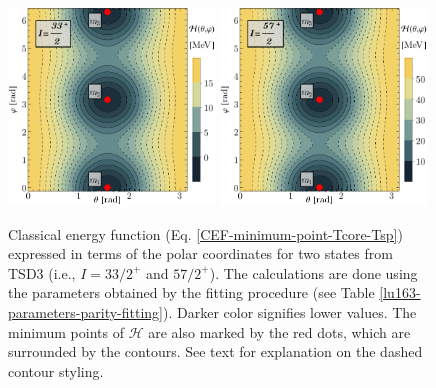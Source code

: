 \begin{figure}
    \centering
    \includegraphics[width=0.49\textwidth]{Chapters/Figures/parity-partners-plots/contour-tsd3-1.pdf}
    \includegraphics[width=0.49\textwidth]{Chapters/Figures/parity-partners-plots/contour-tsd3-2.pdf}
    \caption{Classical energy function (Eq. \ref{CEF-minimum-point-Tcore-Tsp}) expressed in terms of the polar coordinates for two states from TSD3 (i.e., $I=33/2^+$ and $57/2^+$). The calculations are done using the parameters obtained by the fitting procedure (see Table \ref{lu163-parameters-parity-fitting}). Darker color signifies lower values. The minimum points of $\mathcal{H}$ are also marked by the red dots, which are surrounded by the contours. See text for explanation on the dashed contour styling.}
    \label{contour-cef-polar-tsd3}
\end{figure}
